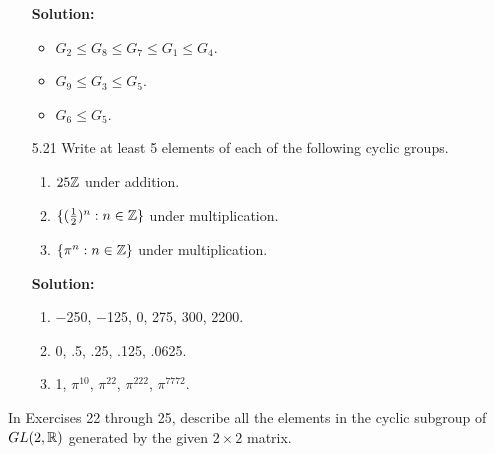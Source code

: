 \begin{enumerate}
      \textbf{Solution:}

      \begin{itemize}
         \item $G_2 \le G_8 \le G_7 \le G_1 \le G_4$.
         \item $G_9 \le G_3 \le G_5$.
         \item $G_6 \le G_5$.
      \end{itemize}
   \item[5.21] Write at least 5 elements of each of the following cyclic groups.
               \begin{enumerate}
                  \item $25\mathbb{Z}$ under addition.
                  \item $\{(\frac{1}{2})^n : n \in \mathbb{Z}\}$ under multiplication.
                  \item $\{\pi^n : n \in \mathbb{Z}\}$ under multiplication.
               \end{enumerate}

      \textbf{Solution:}

      \begin{enumerate}
         \item $-$250, $-$125, 0, 275, 300, 2200.
         \item 0, .5, .25, .125, .0625.
         \item 1, $\pi^{10}$, $\pi^{22}$, $\pi^{222}$, $\pi^{7772}$.
      \end{enumerate}
   
\end{enumerate}

\noindent      In Exercises 22 through 25, describe all the elements in the
               cyclic subgroup of $GL(2, \mathbb{R})$ generated by the given
               $2 \times 2$ matrix.

